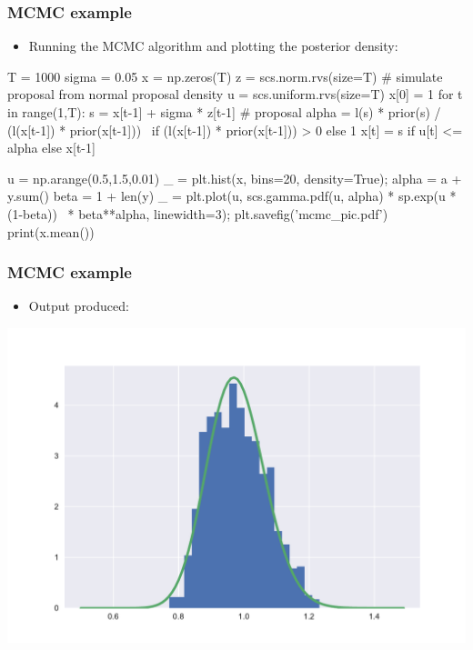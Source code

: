 \documentclass[xcolor=table,10pt]{beamer}
\begin{document}
\begin{frame}[fragile]
  \frametitle{MCMC example}
  \begin{itemize}
  \item Running the MCMC algorithm and plotting the posterior density:
  \end{itemize}
{\scriptsize%
  \begin{pyconsole}[session1][frame=single]
    
T = 1000
sigma = 0.05
x = np.zeros(T)
z = scs.norm.rvs(size=T) # simulate proposal from normal proposal density
u = scs.uniform.rvs(size=T)
x[0] = 1
for t in range(1,T):
    s = x[t-1] + sigma * z[t-1] # proposal
    alpha = l(s) * prior(s) / (l(x[t-1]) * prior(x[t-1])) \
            if (l(x[t-1]) * prior(x[t-1])) > 0 else 1
    x[t] = s if u[t] <= alpha else x[t-1]

u = np.arange(0.5,1.5,0.01)
_ = plt.hist(x, bins=20, density=True);
alpha = a + y.sum()
beta = 1 + len(y)
_ = plt.plot(u, scs.gamma.pdf(u, alpha) * sp.exp(u * (1-beta)) \
    * beta**alpha, linewidth=3);
plt.savefig('mcmc_pic.pdf')
print(x.mean())
\end{pyconsole}
}
\end{frame}

\begin{frame}[fragile]
  \frametitle{MCMC example}
  \begin{itemize}
  \item Output produced:
  \end{itemize}
  \begin{center}
  \includegraphics[scale=.4]{mcmc_pic.pdf}
\end{center}
\end{frame}
\end{document}
